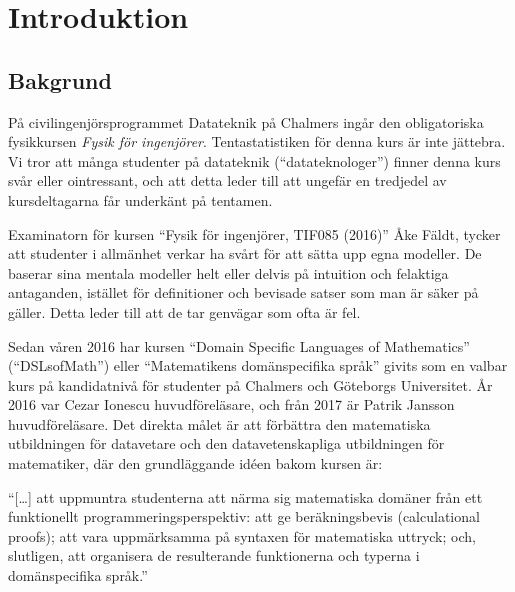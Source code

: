 
\chapter{Introduktion}

\section{Bakgrund}

\begin{binge}

På civilingenjörsprogrammet Datateknik på Chalmers ingår den obligatoriska fysikkursen
\textit{Fysik för ingenjörer}. Tentastatistiken för denna kurs är
inte jättebra\cite{tentastatistik}. Vi
tror att många studenter på datateknik (``datateknologer'') finner denna kurs
svår eller ointressant, och att detta leder till att ungefär en
tredjedel av kursdeltagarna får underkänt på tentamen.

Examinatorn för kursen ``Fysik för ingenjörer, TIF085 (2016)'' Åke Fäldt, tycker
att studenter i allmänhet verkar ha svårt för att sätta upp egna
modeller. De baserar sina mentala modeller helt eller delvis på
intuition och felaktiga antaganden, istället för definitioner och
bevisade satser som man är säker på gäller. Detta leder till att de
tar genvägar som ofta är fel.

Sedan våren 2016 har kursen ``Domain Specific Languages of
Mathematics'' (``DSLsofMath'') eller ``Matematikens domänspecifika språk''
givits som en valbar kurs på kandidatnivå för studenter på Chalmers och
Göteborgs Universitet. År 2016 var Cezar Ionescu huvudföreläsare, och från 2017
är Patrik Jansson huvudföreläsare. Det direkta målet är att förbättra den
matematiska utbildningen för datavetare och den datavetenskapliga utbildningen
för matematiker, där den grundläggande idéen bakom kursen är: 

\begin{center}
  ``[\dots] att uppmuntra studenterna att närma sig matematiska domäner från ett
  funktionellt programmeringsperspektiv: att ge beräkningsbevis (calculational
  proofs); att vara uppmärksamma på syntaxen för matematiska uttryck; och,
  slutligen, att organisera de resulterande funktionerna och typerna i
  domänspecifika språk.''\cite{lecture-notes}\cite{tfpie2015} 
\end{center}


\end{binge}
